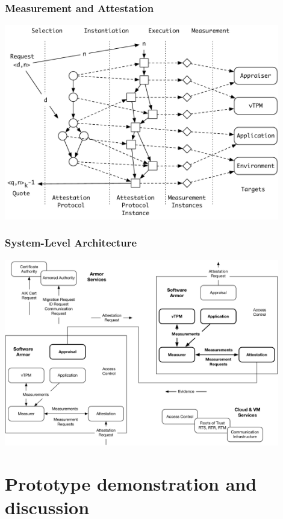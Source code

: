 \documentclass{beamer}
\begin{document}
\begin{frame}
  \frametitle{Measurement and Attestation}
  \begin{center}
  \includegraphics[width=0.9\textwidth]{figures/ap-1.pdf}
  \end{center}
\end{frame}

\begin{frame}
  \frametitle{System-Level Architecture}
  \begin{center}
  \includegraphics[width=0.9\textwidth]{figures/system.pdf}
  \end{center}
\end{frame}

\section{Prototype demonstration and discussion}

  
\end{document}
